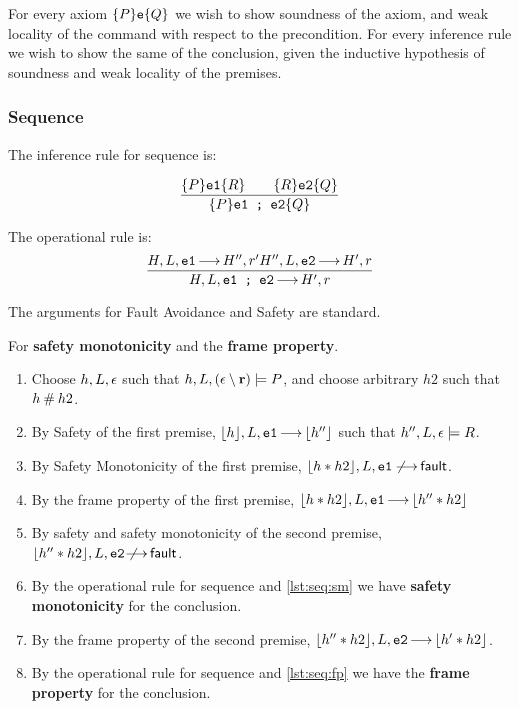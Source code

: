 \documentclass{article}
\begin{document}
For every axiom $\{P\}\mbox{\texttt{{\upshape e}}}\{Q\}$ we wish to show soundness of the axiom, and weak locality of the command with respect to the precondition.
For every inference rule we wish to show the same of the conclusion, given the inductive hypothesis of soundness and weak locality of the premises.

\subsubsection{Sequence}
\label{sec:sequence}

The inference rule for sequence is:

\[
\frac{\{P\}\mbox{\texttt{{\upshape e1}}}\{R\}\qquad
\{R\}\mbox{\texttt{{\upshape e2}}}\{Q\}}
{\{P\}\mbox{\texttt{{\upshape e1 ; e2}}}\{Q\}} \]

The operational rule is:
\[
\frac{H,L,\mbox{\texttt{{\upshape e1}}}{\,\longrightarrow\,} H'',r'\\ H'',L,\mbox{\texttt{{\upshape e2}}}{\,\longrightarrow\,} H',r}
{H,L, \mbox{\texttt{{\upshape e1 ; e2}}} {\,\longrightarrow\,} H',r}
\]

The arguments for Fault Avoidance and Safety are standard.

For {\bf safety monotonicity} and the {\bf frame property}.
\begin{enumerate}
\item
Choose $h,L,\epsilon$ such that $h,L,(\epsilon\setminus{\ensuremath{\mathrm{\textbf{r}}}})\models P$, and choose arbitrary $h2$ such that $h\mathbin{\#} h2$. 
\item
By Safety of the first premise, $\lfloor h\rfloor,L,\mbox{\texttt{{\upshape e1}}}{\,\longrightarrow\,} \lfloor h''\rfloor$ such that $h'',L,\epsilon\models R$. 
\item
By Safety Monotonicity of the first premise, $\lfloor h\mathbin{*} h2\rfloor,L,\mbox{\texttt{{\upshape e1}}}\not\!\!\!{\,\longrightarrow\,}{\mathsf{fault}}$.
\item
By the frame property of the first premise, $\lfloor h\mathbin{*} h2\rfloor,L,\mbox{\texttt{{\upshape e1}}}{\,\longrightarrow\,}\lfloor h''\mathbin{*} h2\rfloor$
\item \label{lst:seq:sm}
By safety and safety monotonicity of the second premise, \\
$\lfloor h''\mathbin{*} h2\rfloor,L,\mbox{\texttt{{\upshape e2}}}\not\!\!\!\!{\,\longrightarrow\,}{\mathsf{fault}}$.
\item
        By the operational rule for sequence and \ref{lst:seq:sm} we have {\bf safety monotonicity} for the conclusion.
\item \label{lst:seq:fp}
        By the frame property of the second premise, $\lfloor h''\mathbin{*} h2\rfloor,L,\mbox{\texttt{{\upshape e2}}}{\,\longrightarrow\,}\lfloor h'\mathbin{*} h2\rfloor$.
\item 
        By the operational rule for sequence and \ref{lst:seq:fp} we have the {\bf frame property} for the conclusion.
\end{enumerate}
\end{document}
